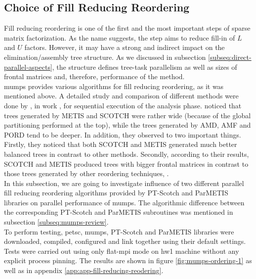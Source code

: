 \subsection{Choice of Fill Reducing Reordering}
\label{subseq:fill-in-reordering}

Fill reducing reordering is one of the first and the most important steps of sparse matrix factorization. As the name suggests, the step aims to reduce fill-in of $L$ and $U$ factors. However, it may have a strong and indirect impact on the elimination/assembly tree structure. As we discussed in subsection \ref{subseq:direct-parallel-aspects}, the structure defines tree-task parallelism as well as sizes of frontal matrices and, therefore, performance of the method.\\


\acrshort{mumps} provides various algorithms for fill reducing reordering, as it was mentioned above. A detailed study and comparison of different methods were done by \citeauthor{guermouche2003memory}, in work \cite{guermouche2003memory}, for sequential execution of the analysis phase. \citeauthor{guermouche2003memory} noticed that  trees generated by METIS and SCOTCH were rather wide (because of the global partitioning performed at the top), while the trees generated by AMD, AMF and PORD tend to be deeper. In addition, they observed to two important things. Firstly, they noticed that both SCOTCH and METIS generated much better balanced trees in contrast to other methods. Secondly, according to their results, SCOTCH and METIS produced trees with bigger frontal matrices in contrast to those trees generated by other reordering techniques, \cite{guermouche2003memory}.\\


In this subsection, we are going to investigate influence of two different parallel fill reducing reordering algorithms provided by PT-Scotch and ParMETIS libraries on parallel performance of \acrshort{mumps}. The algorithmic difference between the corresponding PT-Scotch and ParMETIS subroutines was mentioned in subsection \ref{subseq:mumps-review}.\\


To perform testing, \acrshort{petsc}, \acrshort{mumps}, PT-Scotch and ParMETIS libraries were downloaded, compiled, configured and link together using their default settings. Tests were carried out using only flat-\acrshort{mpi} mode on \gls{hw1} machine without any explicit process pinning. The results are shown in figure \ref{fig:mumps-ordering-1} as well as in appendix \ref{app:app-fill-reducing-reodering}.\\


